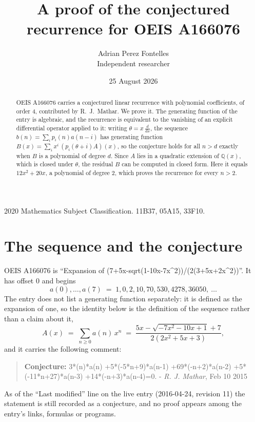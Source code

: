 \documentclass[11pt,a4paper]{article}
\title{A proof of the conjectured recurrence for OEIS A166076}
\author{Adrian Perez Fontelles\\ \small Independent researcher}
\date{25 August 2026}
\theoremstyle{plain}
\theoremstyle{definition}
\begin{document}
\maketitle

\begin{abstract}
OEIS A166076 carries a conjectured linear recurrence with polynomial coefficients, of
order 4, contributed by R.~J.~Mathar. We prove it. The generating function of the
entry is algebraic, and the recurrence is equivalent to the vanishing of an explicit
differential operator applied to it: writing $\theta=x\,\frac{d}{dx}$, the sequence
$b(n)=\sum_{i}p_{i}(n)a(n-i)$ has generating function
$B(x)=\sum_{i}x^{i}\,(p_{i}(\theta+i)A)(x)$, so the conjecture holds for all $n>d$ exactly
when $B$ is a polynomial of degree $d$. Since $A$ lies in a quadratic extension of
$\mathbb{Q}(x)$, which is closed under $\theta$, the residual $B$ can be computed in
closed form. Here it equals $12 x^{2} + 20 x$, a polynomial of degree $2$, which proves
the recurrence for every $n>2$.
\end{abstract}

\noindent\small 2020 Mathematics Subject Classification. 11B37, 05A15, 33F10.\normalsize

\section{The sequence and the conjecture}

OEIS A166076 is ``Expansion of (7+5x-sqrt(1-10x-7x\^{}2))/(2(3+5x+2x\^{}2))''. It has offset $0$ and begins
\[
a(0),\dots,a(7)\;=\;1, 0, 2, 10, 70, 530, 4278, 36050,\ \dots
\]
The entry does not list a generating function separately: it is defined as the
expansion of one, so the identity below is the definition of the sequence rather than a
claim about it,
\begin{equation}\label{eq:gf}
A(x)\;=\;\sum_{n\ge 0} a(n)\,x^{n}\;=\;\frac{5 x - \sqrt{- 7 x^{2} - 10 x + 1} + 7}{2 \left(2 x^{2} + 5 x + 3\right)} ,
\end{equation}
and it carries the following comment:
\begin{quote}\small
\textbf{Conjecture:} 3*(n)*a(n) +5*(-5*n+9)*a(n-1) +69*(-n+2)*a(n-2) +5*(-11*n+27)*a(n-3) +14*(-n+3)*a(n-4)=0. - \emph{R. J. Mathar}, Feb 10 2015
\end{quote}
As of the ``Last modified'' line on the live entry (2016-04-24, revision 11) the
statement is still recorded as a conjecture, and no proof appears among the entry's links,
formulas or programs.
\end{document}
